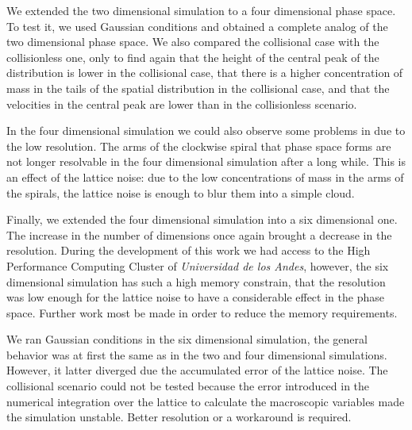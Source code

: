 We extended the two dimensional simulation to a four dimensional phase space. To test it, we used Gaussian conditions and obtained a complete analog of the two dimensional phase space. We also compared the collisional case with the collisionless one, only to find again that the height of the central peak of the distribution is lower in the collisional case, that there is a higher concentration of mass in the tails of the spatial distribution in the collisional case, and that the velocities in the central peak are lower than in the collisionless scenario.

In the four dimensional simulation we could also observe some problems in due to the low resolution. The arms of the clockwise spiral that phase space forms are not longer resolvable in the four dimensional simulation after a long while. This is an effect of the lattice noise: due to the low concentrations of mass in the arms of the spirals, the lattice noise is enough to blur them into a simple cloud. 

Finally, we extended the four dimensional simulation into a six dimensional one. The increase in the number of dimensions once again brought a decrease in the resolution. During the development of this work we had access to the High Performance Computing Cluster of \emph{Universidad de los Andes}, however, the six dimensional simulation has such a high memory constrain, that the resolution was low enough for the lattice noise to have a considerable effect in the phase space. Further work most be made in order to reduce the memory requirements. 

We ran Gaussian conditions in the six dimensional simulation, the general behavior was at first the same as in the two and four dimensional simulations. However, it latter diverged due the accumulated error of the lattice noise. The collisional scenario could not be tested because the error introduced in the numerical integration over the lattice to calculate the macroscopic variables made the simulation unstable. Better resolution or a workaround is required.

